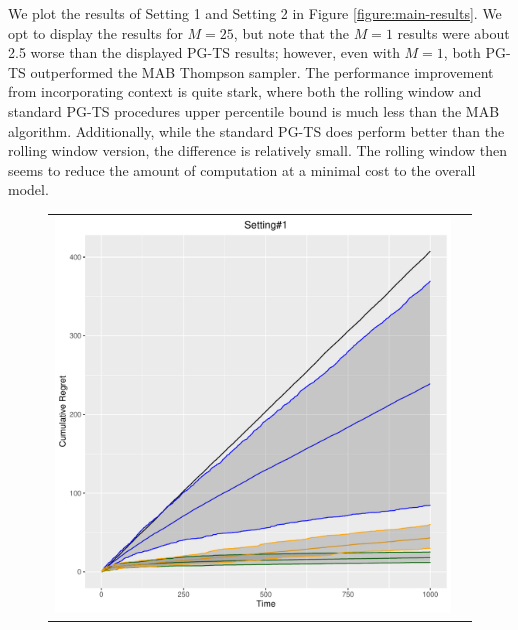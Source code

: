 \documentclass[12pt]{article}
\begin{document}
We plot the results of Setting 1 and Setting 2 in Figure \ref{figure:main-results}.
We opt to display the results for $M = 25$, but note that the $M = 1$ results were
about 2.5 worse than the displayed PG-TS results; however, even with $M = 1$, both
PG-TS outperformed the MAB Thompson sampler.
The performance improvement from incorporating context is quite stark, where both 
the rolling window and standard PG-TS procedures upper percentile bound is much 
less than the MAB algorithm.
Additionally, while the standard PG-TS does perform better than the rolling window 
version, the difference is relatively small.
The rolling window then seems to reduce the amount of computation at a minimal
cost to the overall model.

\begin{figure}[t]
\centering
\begin{tabular}{c c}
\includegraphics[scale = .4]{../../figures/experiment1-plot.pdf} &

\end{tabular}
\end{figure}
\end{document}
